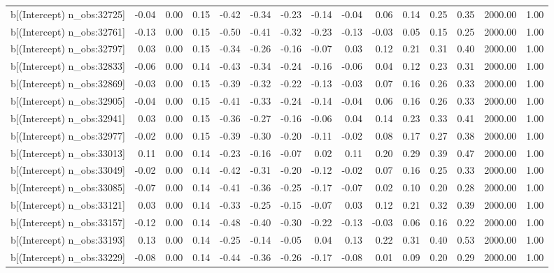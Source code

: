 \begin{table}[ht]
\begin{tabular}{rrrrrrrrrrrrrrr}
  b[(Intercept) n\_obs:32725] & -0.04 & 0.00 & 0.15 & -0.42 & -0.34 & -0.23 & -0.14 & -0.04 & 0.06 & 0.14 & 0.25 & 0.35 & 2000.00 & 1.00 \\ 
  b[(Intercept) n\_obs:32761] & -0.13 & 0.00 & 0.15 & -0.50 & -0.41 & -0.32 & -0.23 & -0.13 & -0.03 & 0.05 & 0.15 & 0.25 & 2000.00 & 1.00 \\ 
  b[(Intercept) n\_obs:32797] & 0.03 & 0.00 & 0.15 & -0.34 & -0.26 & -0.16 & -0.07 & 0.03 & 0.12 & 0.21 & 0.31 & 0.40 & 2000.00 & 1.00 \\ 
  b[(Intercept) n\_obs:32833] & -0.06 & 0.00 & 0.14 & -0.43 & -0.34 & -0.24 & -0.16 & -0.06 & 0.04 & 0.12 & 0.23 & 0.31 & 2000.00 & 1.00 \\ 
  b[(Intercept) n\_obs:32869] & -0.03 & 0.00 & 0.15 & -0.39 & -0.32 & -0.22 & -0.13 & -0.03 & 0.07 & 0.16 & 0.26 & 0.33 & 2000.00 & 1.00 \\ 
  b[(Intercept) n\_obs:32905] & -0.04 & 0.00 & 0.15 & -0.41 & -0.33 & -0.24 & -0.14 & -0.04 & 0.06 & 0.16 & 0.26 & 0.33 & 2000.00 & 1.00 \\ 
  b[(Intercept) n\_obs:32941] & 0.03 & 0.00 & 0.15 & -0.36 & -0.27 & -0.16 & -0.06 & 0.04 & 0.14 & 0.23 & 0.33 & 0.41 & 2000.00 & 1.00 \\ 
  b[(Intercept) n\_obs:32977] & -0.02 & 0.00 & 0.15 & -0.39 & -0.30 & -0.20 & -0.11 & -0.02 & 0.08 & 0.17 & 0.27 & 0.38 & 2000.00 & 1.00 \\ 
  b[(Intercept) n\_obs:33013] & 0.11 & 0.00 & 0.14 & -0.23 & -0.16 & -0.07 & 0.02 & 0.11 & 0.20 & 0.29 & 0.39 & 0.47 & 2000.00 & 1.00 \\ 
  b[(Intercept) n\_obs:33049] & -0.02 & 0.00 & 0.14 & -0.42 & -0.31 & -0.20 & -0.12 & -0.02 & 0.07 & 0.16 & 0.25 & 0.33 & 2000.00 & 1.00 \\ 
  b[(Intercept) n\_obs:33085] & -0.07 & 0.00 & 0.14 & -0.41 & -0.36 & -0.25 & -0.17 & -0.07 & 0.02 & 0.10 & 0.20 & 0.28 & 2000.00 & 1.00 \\ 
  b[(Intercept) n\_obs:33121] & 0.03 & 0.00 & 0.14 & -0.33 & -0.25 & -0.15 & -0.07 & 0.03 & 0.12 & 0.21 & 0.32 & 0.39 & 2000.00 & 1.00 \\ 
  b[(Intercept) n\_obs:33157] & -0.12 & 0.00 & 0.14 & -0.48 & -0.40 & -0.30 & -0.22 & -0.13 & -0.03 & 0.06 & 0.16 & 0.22 & 2000.00 & 1.00 \\ 
  b[(Intercept) n\_obs:33193] & 0.13 & 0.00 & 0.14 & -0.25 & -0.14 & -0.05 & 0.04 & 0.13 & 0.22 & 0.31 & 0.40 & 0.53 & 2000.00 & 1.00 \\ 
  b[(Intercept) n\_obs:33229] & -0.08 & 0.00 & 0.14 & -0.44 & -0.36 & -0.26 & -0.17 & -0.08 & 0.01 & 0.09 & 0.20 & 0.29 & 2000.00 & 1.00 \\ 

\end{tabular}
\end{table}
